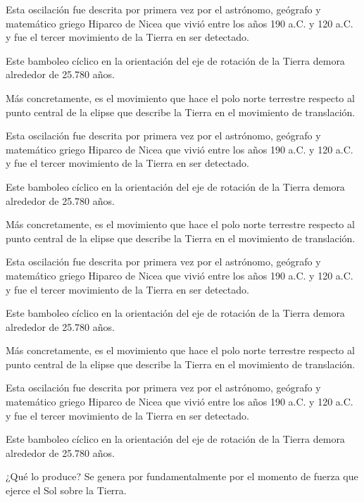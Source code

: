 \documentclass[12pt,a4paper]{article}
\begin{document}
Esta oscilación fue descrita por primera vez por el astrónomo, geógrafo y matemático griego Hiparco de Nicea 
que vivió entre los años 190 a.C. y 120 a.C. y fue el tercer movimiento de la Tierra en ser detectado.

Este bamboleo cíclico en la orientación del eje de rotación de la Tierra demora alrededor de 25.780 años. 

Más concretamente, es el movimiento que hace el polo norte terrestre respecto al punto central de la elipse 
que describe la Tierra en el movimiento de translación.

Esta oscilación fue descrita por primera vez por el astrónomo, geógrafo y matemático griego Hiparco de Nicea 
que vivió entre los años 190 a.C. y 120 a.C. y fue el tercer movimiento de la Tierra en ser detectado.

Este bamboleo cíclico en la orientación del eje de rotación de la Tierra demora alrededor de 25.780 años. 

Más concretamente, es el movimiento que hace el polo norte terrestre respecto al punto central de la elipse 
que describe la Tierra en el movimiento de translación.

Esta oscilación fue descrita por primera vez por el astrónomo, geógrafo y matemático griego Hiparco de Nicea 
que vivió entre los años 190 a.C. y 120 a.C. y fue el tercer movimiento de la Tierra en ser detectado.

Este bamboleo cíclico en la orientación del eje de rotación de la Tierra demora alrededor de 25.780 años. 

Más concretamente, es el movimiento que hace el polo norte terrestre respecto al punto central de la elipse 
que describe la Tierra en el movimiento de translación.

Esta oscilación fue descrita por primera vez por el astrónomo, geógrafo y matemático griego Hiparco de Nicea 
que vivió entre los años 190 a.C. y 120 a.C. y fue el tercer movimiento de la Tierra en ser detectado.

Este bamboleo cíclico en la orientación del eje de rotación de la Tierra demora alrededor de 25.780 años. 





¿Qué lo produce? Se genera por fundamentalmente por el momento de fuerza que ejerce el Sol sobre la Tierra. 
\end{document}
